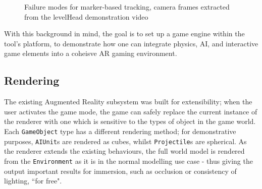 \documentclass[a4paper,10pt]{article}
\begin{document}
\begin{figure}[t]
    \vspace{10pt}
    \quad
    \vspace{10pt}
    \caption{Failure modes for marker-based tracking, camera frames extracted from the levelHead demonstration video}
    \vspace{10pt}
    \label{markerfail}
\end{figure}

With this background in mind, the goal is to set up a game engine within the tool's platform, to demonstrate how one can integrate physics, AI, and interactive game elements into a coheisve AR gaming environment.

\subsection{Rendering}
The existing Augmented Reality subsystem was built for extensibility; when the user activates the game mode, the game can safely replace the current instance of the renderer with one which is sensitive to the types of object in the game world. Each \texttt{GameObject} type has a different rendering method; for demonstrative purposes, \texttt{AIUnit}s are rendered as cubes, whilst \texttt{Projectile}s are spherical. As the renderer extends the existing behaviours, the full world model is rendered from the \texttt{Environment} as it is in the normal modelling use case - thus giving the output important results for immersion, such as occlusion or consistency of lighting, ``for free".
\end{document}
